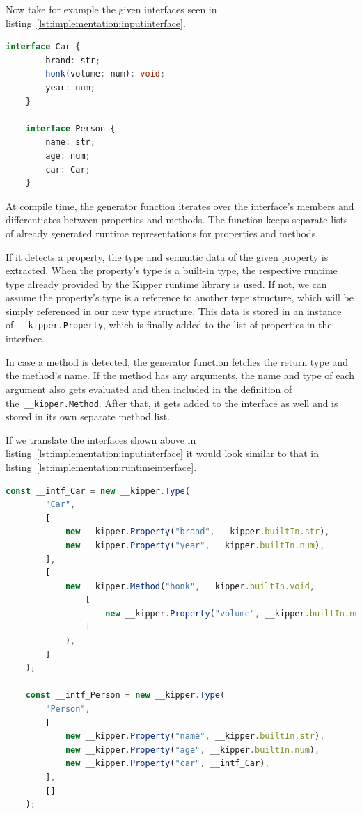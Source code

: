 Now take for example the given interfaces seen in listing~\ref{lst:implementation:inputinterface}.

\begin{lstlisting}[language=Typescript,caption=Example interfaces in the Kipper language,label=lst:implementation:inputinterface]
	interface Car {
		brand: str;
		honk(volume: num): void;
		year: num;
	}

	interface Person {
		name: str;
		age: num;
		car: Car;
	}
\end{lstlisting}

At compile time, the generator function iterates over the interface's members and differentiates between properties and methods. The function keeps separate lists of already generated runtime representations for properties and methods.

If it detects a property, the type and semantic data of the given property is extracted. When the property's type is a built-in type, the respective runtime type already provided by the Kipper runtime library is used. If not, we can assume the property's type is a reference to another type structure, which will be simply referenced in our new type structure. This data is stored in an instance of~\lstinline|__kipper.Property|, which is finally added to the list of properties in the interface.

In case a method is detected, the generator function fetches the return type and the method's name. If the method has any arguments, the name and type of each argument also gets evaluated and then included in the definition of the~\lstinline|__kipper.Method|. After that, it gets added to the interface as well and is stored in its own separate method list.

If we translate the interfaces shown above in listing~\ref{lst:implementation:inputinterface} it would look similar to that in listing~\ref{lst:implementation:runtimeinterface}.

\begin{lstlisting}[language=Typescript,caption=The runtime representation of the previous interfaces,label=lst:implementation:runtimeinterface]
	const __intf_Car = new __kipper.Type(
		"Car",
		[
			new __kipper.Property("brand", __kipper.builtIn.str),
			new __kipper.Property("year", __kipper.builtIn.num),
		],
		[
			new __kipper.Method("honk", __kipper.builtIn.void,
				[
					new __kipper.Property("volume", __kipper.builtIn.num),
				]
			),
		]
	);

	const __intf_Person = new __kipper.Type(
		"Person",
		[
			new __kipper.Property("name", __kipper.builtIn.str),
			new __kipper.Property("age", __kipper.builtIn.num),
			new __kipper.Property("car", __intf_Car),
		],
		[]
	);
\end{lstlisting}


